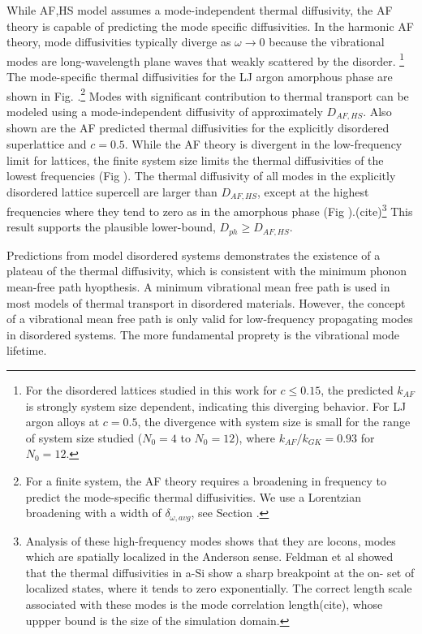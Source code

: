 \documentclass[aps,prb,twocolumn,superscriptaddress,amsmath,amssymb,floatfix]{revtex4}
\begin{document}
While AF,HS model assumes a mode-independent thermal diffusivity, 
the AF theory is capable of predicting the mode specific 
diffusivities.\cite{feldman_thermal_1993,feldman_thermal_1993,
feldman_numerical_1999,shenogin_predicting_2009} 
In the harmonic AF theory, mode diffusivities 
typically diverge as $\omega \rightarrow 0$ because
the vibrational modes are long-wavelength plane waves  
that weakly scattered by the disorder.
\cite{sheng_introduction_2006,vitelli_heat_2010}\footnote[1]
{For the disordered lattices studied 
in this work for $c\le0.15$, the predicted $k_{AF}$ is strongly 
system size dependent, indicating this diverging behavior. 
For LJ argon alloys at $c=0.5$, the divergence with system size is 
small for the range of system size studied ($N_0=4$ to $N_0=12$), 
where $k_{AF}/k_{GK} = 0.93$ for $N_0=12$.} 
The mode-specific thermal diffusivities for the LJ argon amorphous phase 
are shown in Fig. .\footnote[2]{For a finite system, the AF theory 
requires a broadening in frequency to predict the mode-specific thermal 
diffusivities.  We use a Lorentzian broadening with a width of 
$\delta_{\omega,avg}$, see Section .} Modes with significant 
contribution to thermal transport can be modeled using a mode-independent 
diffusivity of approximately $D_{AF,HS}$.  
Also shown are the AF predicted thermal 
diffusivities for the explicitly disordered superlattice and $c=0.5$. 
While the AF theory is divergent in the low-frequency limit for lattices,  
the finite system size limits the thermal diffusivities of the lowest 
frequencies (Fig ). The thermal diffusivity of all 
modes in the explicitly disordered lattice supercell are 
larger than $D_{AF,HS}$, except 
at the highest frequencies where they tend to zero as in the amorphous 
phase (Fig ).(cite)\footnote[3]{Analysis of these high-frequency 
modes shows that they are locons, 
modes which are spatially localized in the Anderson sense. 
Feldman et al showed that the thermal 
diffusivities in a-Si show a sharp breakpoint at the on-
set of localized states, where it tends to zero exponentially. 
The correct 
length scale associated with these modes is the mode correlation 
length(cite), whose uppper bound is the size of the simulation domain.} 
This result supports the plausible lower-bound, $D_{ph} \ge D_{AF,HS}$. 

Predictions from model 
disordered systems demonstrates the existence of a plateau of the 
thermal diffusivity, 
which is consistent with the minimum phonon mean-free path hyopthesis.
\cite{sheng_heat_1991} 
A minimum vibrational mean free path is used in most models of thermal 
transport in disordered materials.
\cite{kittel_interpretation_1949,cahill_lattice_1988,
graebner_phonon_1986} However, the concept of 
a vibrational mean free path is only valid for low-frequency propagating 
modes in disordered systems.\cite{feldman_numerical_1999} The more 
fundamental proprety is the vibrational mode lifetime.
\cite{taraskin_determination_1999}  
\end{document}
